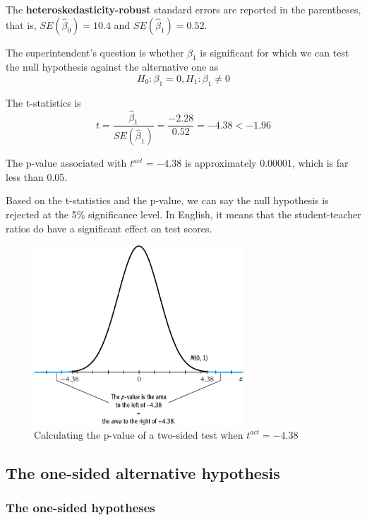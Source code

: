\documentclass[a4paper,11pt]{article}
\begin{document}
\begin{itemize}
The \textbf{heteroskedasticity-robust} standard errors are reported in the
parentheses, that is, \(SE(\hat{\beta}_0) = 10.4\) and
\(SE(\hat{\beta}_1) = 0.52\). 

The superintendent's question is whether \(\beta_1\) is significant for
which we can test the null hypothesis against the alternative one as
\[ H_0: \beta_1 = 0, H_1: \beta_1 \neq 0 \]

The t-statistics is
\[ t = \frac{\hat{\beta}_1}{SE(\hat{\beta}_1)} = \frac{-2.28}{0.52}
= -4.38 < -1.96 \] 

The p-value associated with \(t^{act} = -4.38\) is approximately
0.00001, which is far less than 0.05. 

Based on the t-statistics and the p-value, we can say the null
hypothesis is rejected at the 5\% significance level. In English, it
means that the student-teacher ratios do have a significant effect on
test scores. 

\begin{figure}[htbp]
\centering
\includegraphics[width=0.7\textwidth]{figure/fig-5-1.png}
\caption{\label{fig:org8d8f514}
Calculating the p-value of a two-sided test when \(t^{act}=-4.38\)}
\end{figure}
\end{itemize}


\subsection{The one-sided alternative hypothesis}
\label{sec:orgb607691}

\subsubsection*{The one-sided hypotheses}
\label{sec:orgd33ede2}
\end{document}
